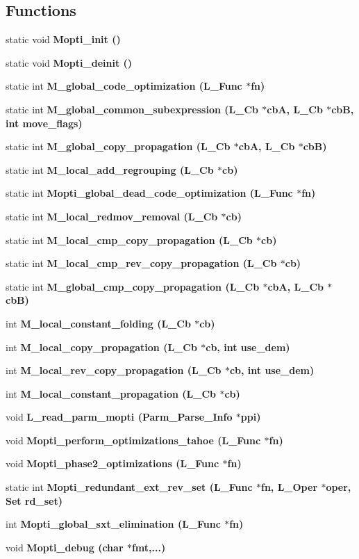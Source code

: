 \subsection*{Functions}
\begin{CompactItemize}
\item 
static void \bf{Mopti\_\-init} ()
\item 
static void \bf{Mopti\_\-deinit} ()
\item 
static int \bf{M\_\-global\_\-code\_\-optimization} (L\_\-Func $\ast$fn)
\item 
static int \bf{M\_\-global\_\-common\_\-subexpression} (L\_\-Cb $\ast$cb\-A, L\_\-Cb $\ast$cb\-B, int move\_\-flags)
\item 
static int \bf{M\_\-global\_\-copy\_\-propagation} (L\_\-Cb $\ast$cb\-A, L\_\-Cb $\ast$cb\-B)
\item 
static int \bf{M\_\-local\_\-add\_\-regrouping} (L\_\-Cb $\ast$cb)
\item 
static int \bf{Mopti\_\-global\_\-dead\_\-code\_\-optimization} (L\_\-Func $\ast$fn)
\item 
static int \bf{M\_\-local\_\-redmov\_\-removal} (L\_\-Cb $\ast$cb)
\item 
static int \bf{M\_\-local\_\-cmp\_\-copy\_\-propagation} (L\_\-Cb $\ast$cb)
\item 
static int \bf{M\_\-local\_\-cmp\_\-rev\_\-copy\_\-propagation} (L\_\-Cb $\ast$cb)
\item 
static int \bf{M\_\-global\_\-cmp\_\-copy\_\-propagation} (L\_\-Cb $\ast$cb\-A, L\_\-Cb $\ast$cb\-B)
\item 
int \bf{M\_\-local\_\-constant\_\-folding} (L\_\-Cb $\ast$cb)
\item 
int \bf{M\_\-local\_\-copy\_\-propagation} (L\_\-Cb $\ast$cb, int use\_\-dem)
\item 
int \bf{M\_\-local\_\-rev\_\-copy\_\-propagation} (L\_\-Cb $\ast$cb, int use\_\-dem)
\item 
int \bf{M\_\-local\_\-constant\_\-propagation} (L\_\-Cb $\ast$cb)
\item 
void \bf{L\_\-read\_\-parm\_\-mopti} (Parm\_\-Parse\_\-Info $\ast$ppi)
\item 
void \bf{Mopti\_\-perform\_\-optimizations\_\-tahoe} (L\_\-Func $\ast$fn)
\item 
void \bf{Mopti\_\-phase2\_\-optimizations} (L\_\-Func $\ast$fn)
\item 
static int \bf{Mopti\_\-redundant\_\-ext\_\-rev\_\-set} (L\_\-Func $\ast$fn, L\_\-Oper $\ast$oper, Set rd\_\-set)
\item 
int \bf{Mopti\_\-global\_\-sxt\_\-elimination} (L\_\-Func $\ast$fn)
\item 
void \bf{Mopti\_\-debug} (char $\ast$fmt,...)
\end{CompactItemize}
